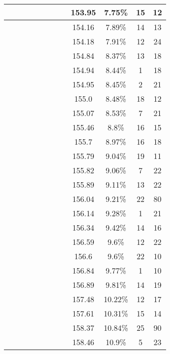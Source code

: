 \begin{center}
\begin{longtable}{|c|c|c|c|c|c|c|c|c|c|c|c|}
 \x &  &  &  &  \x &  \x &  &  & 153.95 & 7.75\% & 15 & 12 \\ \hline
 \x &  &  \x &  &  \x &  &  &  & 154.16 & 7.89\% & 14 & 13 \\ \hline
 \x &  \x &  &  \x &  &  &  &  & 154.18 & 7.91\% & 12 & 24 \\ \hline
 \x &  \x &  \x &  \x &  &  &  \x &  & 154.84 & 8.37\% & 13 & 18 \\ \hline
 \x &  &  &  \x &  \x &  \x &  \x &  \x & 154.94 & 8.44\% & 1 & 18 \\ \hline
 \x &  \x &  \x &  \x &  &  &  \x &  \x & 154.95 & 8.45\% & 2 & 21 \\ \hline
 \x &  \x &  &  \x &  &  &  \x &  & 155.0 & 8.48\% & 18 & 12 \\ \hline
 \x &  &  &  &  &  &  &  & 155.07 & 8.53\% & 7 & 21 \\ \hline
 \x &  \x &  \x &  &  \x &  &  \x &  & 155.46 & 8.8\% & 16 & 15 \\ \hline
 \x &  &  \x &  \x &  \x &  &  \x &  & 155.7 & 8.97\% & 16 & 18 \\ \hline
 \x &  \x &  \x &  \x &  \x &  &  &  \x & 155.79 & 9.04\% & 19 & 11 \\ \hline
 \x &  \x &  \x &  &  &  &  \x &  \x & 155.82 & 9.06\% & 7 & 22 \\ \hline
 \x &  &  \x &  \x &  &  &  \x &  \x & 155.89 & 9.11\% & 13 & 22 \\ \hline
 \x &  \x &  &  &  &  &  \x &  & 156.04 & 9.21\% & 22 & 80 \\ \hline
 \x &  &  &  \x &  &  \x &  &  \x & 156.14 & 9.28\% & 1 & 21 \\ \hline
 \x &  \x &  &  &  \x &  &  \x &  \x & 156.34 & 9.42\% & 14 & 16 \\ \hline
 \x &  &  &  \x &  \x &  &  \x &  \x & 156.59 & 9.6\% & 12 & 22 \\ \hline
 \x &  &  &  &  &  \x &  \x &  & 156.6 & 9.6\% & 22 & 10 \\ \hline
 \x &  &  \x &  &  \x &  \x &  \x &  \x & 156.84 & 9.77\% & 1 & 10 \\ \hline
 \x &  &  \x &  &  &  &  \x &  & 156.89 & 9.81\% & 14 & 19 \\ \hline
 \x &  \x &  &  \x &  \x &  &  \x &  \x & 157.48 & 10.22\% & 12 & 17 \\ \hline
 \x &  &  &  \x &  &  &  \x &  & 157.61 & 10.31\% & 15 & 14 \\ \hline
 \x &  &  &  \x &  \x &  &  &  \x & 158.37 & 10.84\% & 25 & 90 \\ \hline
 \x &  \x &  &  &  \x &  &  \x &  & 158.46 & 10.9\% & 5 & 23 \\ \hline

\end{longtable}
\end{center}
